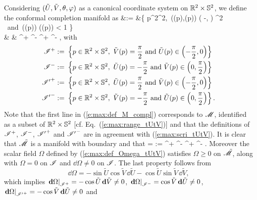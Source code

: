 \ee
Considering $(\tilde{U},\tilde{V},\theta,\varphi)$ as a canonical coordinate system
on $\mathbb{R}^2\times\mathbb{S}^2$, we define the conformal completion manifold as
\bea
    \tilde{\M} &:= &\left\{ p\in \R^2\times\SS^2,\  ((p),(p)) \in \left( -,  \right) ^2 \ \mbox{and}\
       \sinh(\tan {}(p)) \sinh(\tan {}(p)) < 1 \right\}
        \nonumber \\
       & & \cup \scri^+ \cup \scri^- ^+ ^- ,
        \label{e:max:def_M_compl}
\eea
with
\begin{subequations}\label{e:max:def_scri_R2S2}
\begin{align}
   \mathscr{I}^+ := &\ \left\{ p\in \mathbb{R}^2\times\mathbb{S}^2,\  \tilde{V}(p) = \frac{\pi}{2}
        \ \mbox{and}\ \tilde{U}(p) \in \left( -\frac{\pi}{2}, 0 \right) \right\}
            \label{e:max:def_scrip_R2S2} \\
    \mathscr{I}^- := &\ \left\{ p\in \mathbb{R}^2\times\mathbb{S}^2,\  \tilde{U}(p) = -\frac{\pi}{2}
        \ \mbox{and}\ \tilde{V}(p) \in \left( 0, \frac{\pi}{2}\right) \right\} \\
   {\mathscr{I}'}^+ := &\ \left\{ p\in \mathbb{R}^2\times\mathbb{S}^2,\  \tilde{U}(p) = \frac{\pi}{2}
        \ \mbox{and}\ \tilde{V}(p) \in \left( -\frac{\pi}{2}, 0 \right) \right\} \\
   {\mathscr{I}'}^- := &\ \left\{ p\in \mathbb{R}^2\times\mathbb{S}^2,\  \tilde{V}(p) = -\frac{\pi}{2}
        \ \mbox{and}\ \tilde{U}(p) \in \left( 0, \frac{\pi}{2}\right) \right\} .
\end{align}
\end{subequations}
Note that the first line in (\ref{e:max:def_M_compl}) corresponds to $\mathscr{M}$,
identified as a subset of $\mathbb{R}^2\times\mathbb{S}^2$ [cf. Eq.~(\ref{e:max:range_tUtV})]
and that the definitions of $\mathscr{I}^+$, $\mathscr{I}^-$, ${\mathscr{I}'}^+$ and ${\mathscr{I}'}^-$
are in agreement with (\ref{e:max:scri_tUtV}). It is clear that $\tilde{\mathscr{M}}$
is a manifold with boundary and that
\be
    \partial\tilde{\M} = \scri := \scri^+ \cup \scri^- ^+
            \cup {\scri'}^- .
\ee
Moreover the scalar field $\Omega$ defined by (\ref{e:max:def_Omega_tUtV})
satisfies $\Omega \geq 0$ on $\tilde{\mathscr{M}}$, along with
$\Omega = 0$ on $\mathscr{I}$ and $\dd\Omega\not = 0$ on $\mathscr{I}$. The last property
follows from
\[
    \dd\Omega = -\sin\tilde{U} \cos\tilde{V}\, \dd\tilde{U}
            -\cos\tilde{U} \sin\tilde{V}\, \dd\tilde{V} ,
\]
which implies
$\left.\mathbf{d}\Omega\right|_{\mathscr{I}^+} = -\cos\tilde{U}\, \mathbf{d}\tilde{V}\not=0$,
$\left.\mathbf{d}\Omega\right|_{\mathscr{I}^-} = \cos\tilde{V}\, \mathbf{d}\tilde{U}\not=0$,
$\left.\mathbf{d}\Omega\right|_{{\mathscr{I}'}^+} = -\cos\tilde{V}\, \mathbf{d}\tilde{U}\not=0$ and
